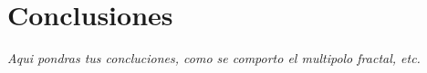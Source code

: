 \documentclass[letterpaper,12pt,oneside]{book}
\begin{document}
    
\mainmatter


% 
%


%
%


%
%



%
%



%
%
\chapter{Conclusiones}  %

\textit{Aqui pondras tus concluciones, como se comporto el multipolo fractal, etc.} 







\backmatter%
\end{document}
